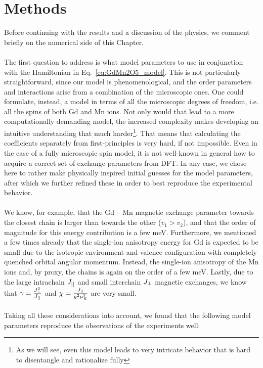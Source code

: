 \section{Methods \label{sec:GdMn2O5_methods}}
Before continuing with the results and a discussion of the physics, we comment briefly on the numerical side of this Chapter.\\\\
The first question to address is what model parameters to use in conjunction with the Hamiltonian in Eq.~\eqref{eq:GdMn2O5_model}.
This is not particularly straightforward, since our model is phenomenological, and the order parameters and interactions arise from a combination of the microscopic ones.
One could formulate, instead, a model in terms of all the microscopic degrees of freedom, i.e. all the spins of both Gd and Mn ions.
Not only would that lead to a more computationally demanding model, the increased complexity makes developing an intuitive understanding that much harder\footnote{As we will see, even this model leads to very intricate behavior that is hard to disentangle and rationalize fully}.
That means that calculating the coefficients separately from first-principles is very hard, if not impossible. Even in the case of a fully microscopic spin model, it is not well-known in general how to acquire a correct set of exchange parameters from DFT.
In any case, we chose here to rather make physically inspired initial guesses for the model parameters, after which we further refined these in order to best reproduce the experimental behavior.
\\\\
We know, for example, that the Gd -- Mn magnetic exchange parameter towards the closest chain is larger than towards the other ($v_1>v_2$), and that the order of magnitude for this energy contribution is a few meV.
Furthermore, we mentioned a few times already that the single-ion anisotropy energy for Gd is expected to be small due to the isotropic environment and valence configuration with completely quenched orbital angular momentum.
Instead, the single-ion anisotropy of the Mn ions and, by proxy, the chains is again on the order of a few meV.
Lastly, due to the large intrachain $J_{||}$ and small interchain $J_{\perp}$ magnetic exchanges, we know that $\gamma = \frac{J_{\perp}^2}{J_{||}}$ and $\chi = \frac{J_{||}}{g^2\mu_B^2}$ are very small.
\\\\
Taking all these considerations into account, we found that the following model parameters reproduce the observations of the experiments well:  
